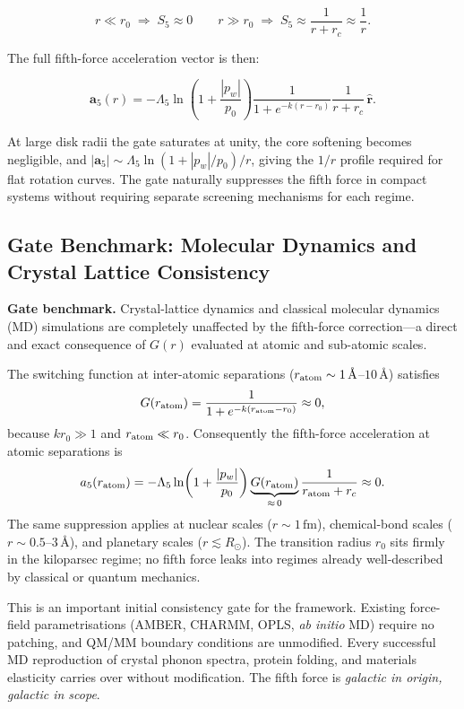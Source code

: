 \documentclass[11pt,a4paper]{article}
\newcommand{\pw}{p_w}                        %
\newcommand{\Lf}{\Lambda_5}                  %
\newcommand{\afive}{\mathbf{a}_5}            %
\newcommand{\afiver}{a_5}                    %
\newcommand{\Sfive}{S_5}                     %
\newcommand{\rhat}{\hat{\mathbf{r}}}         %
\begin{document}
\[
  r \ll r_0 \;\Rightarrow\; \Sfive \approx 0
  \qquad
  r \gg r_0 \;\Rightarrow\; \Sfive \approx \frac{1}{r+r_c} \approx \frac{1}{r} .
\]

The full fifth-force acceleration vector is then:

\begin{keybox}
\[
  \afive(r) = -\Lf \ln\!\left(1+\frac{|\pw|}{p_0}\right)
  \frac{1}{1+e^{-k(r-r_0)}} \frac{1}{r+r_c}\,\rhat .
\]
\end{keybox}

\noindent
At large disk radii the gate saturates at unity, the core softening becomes
negligible, and $|\afive| \sim \Lf\ln(1+|\pw|/p_0)/r$, giving the $1/r$
profile required for flat rotation curves.  The gate naturally suppresses the
fifth force in compact systems without requiring separate screening mechanisms
for each regime.

\subsection{Gate Benchmark: Molecular Dynamics and Crystal Lattice Consistency}
\label{sec:mdbenchmark}

\begin{keybox}
\textbf{Gate benchmark.}\quad
Crystal-lattice dynamics and classical molecular dynamics (MD) simulations are
completely unaffected by the fifth-force correction---a direct and exact
consequence of $G(r)$ evaluated at atomic and sub-atomic scales.
\end{keybox}

\noindent
The switching function at inter-atomic separations ($r_{\rm atom} \sim
1\,\text{\AA}$--$10\,\text{\AA}$) satisfies
\[
  G(r_{\rm atom})
  = \frac{1}{1+e^{-k(r_{\rm atom}-r_0)}}
  \approx 0 ,
\]
because $k r_0 \gg 1$ and $r_{\rm atom} \ll r_0$.
Consequently the fifth-force acceleration at atomic separations is
\[
  \afiver(r_{\rm atom})
  = -\Lf\ln\!\left(1+\frac{|\pw|}{p_0}\right)
    \underbrace{G(r_{\rm atom})}_{\approx\,0}
    \frac{1}{r_{\rm atom}+r_c}
  \approx 0 .
\]
The same suppression applies at nuclear scales ($r \sim 1\,\text{fm}$),
chemical-bond scales ($r \sim 0.5$--$3\,\text{\AA}$), and planetary scales
($r \lesssim R_\odot$).  The transition radius $r_0$ sits firmly in the
kiloparsec regime; no fifth force leaks into regimes already well-described by
classical or quantum mechanics.

This is an important initial consistency gate for the framework.  Existing
force-field parametrisations (AMBER, CHARMM, OPLS, \emph{ab initio} MD) require
no patching, and QM/MM boundary conditions are unmodified.  Every successful
MD reproduction of crystal phonon spectra, protein folding, and materials
elasticity carries over without modification.  The fifth force is
\emph{galactic in origin, galactic in scope}.
\end{document}
